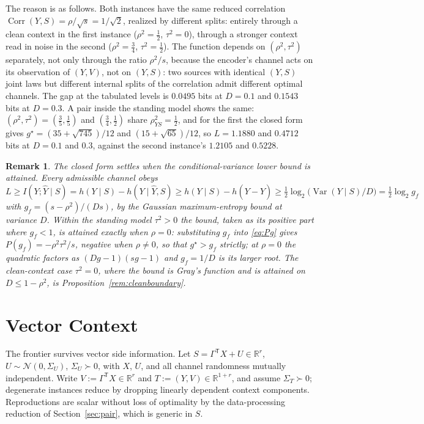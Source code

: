 \documentclass[11pt,onecolumn]{IEEEtran}
\newtheorem{remark}[theorem]{Remark}
\newcommand{\R}{\mathbb{R}}
\newcommand{\hY}{\widehat{Y}}
\begin{document}
The reason is as follows. Both instances have the same
reduced correlation $\operatorname{Corr}(Y,S)=\rho/\sqrt{s}=1/\sqrt2$,
realized by different splits: entirely through a clean context in the
first instance ($\rho^2=\tfrac12$, $\tau^2=0$), through a stronger
context read in noise in the second ($\rho^2=\tfrac34$,
$\tau^2=\tfrac12$). The function depends on $(\rho^2,\tau^2)$
separately, not only through the ratio $\rho^2/s$, because the
encoder's channel acts on its observation of $(Y,V)$, not on $(Y,S)$:
two sources with identical $(Y,S)$ joint laws but different internal
splits of the correlation admit different optimal channels.
The gap at the tabulated levels is $0.0495$ bits at $D=0.1$ and
$0.1543$ bits at $D=0.3$. A pair inside the standing model shows the
same: $(\rho^2,\tau^2)=(\tfrac35,\tfrac15)$ and $(\tfrac34,\tfrac12)$
share $\rho_{YS}^2=\tfrac12$, and for the first the closed form gives
$g^\star=(35+\sqrt{745})/12$ and $(15+\sqrt{65})/12$, so $L=1.1880$ and
$0.4712$ bits at $D=0.1$ and $0.3$, against the second instance's
$1.2105$ and $0.5228$.

\begin{remark}\label{rem:floor}
The closed form settles when the conditional-variance lower bound is
attained. Every admissible channel obeys
$L\ge I(Y;\hY\mid S)=h(Y\mid S)-h(Y\mid\hY,S)\ge h(Y\mid S)-h(Y-\hY)
\ge\tfrac12\log_2\bigl(\operatorname{Var}(Y\mid S)/D\bigr)
=\tfrac12\log_2 g_f$ with $g_f=(s-\rho^2)/(Ds)$, by the Gaussian
maximum-entropy bound at variance $D$. Within the standing model
$\tau^2>0$ the bound, taken as its positive part where $g_f<1$, is
attained exactly when $\rho=0$: substituting $g_f$ into \eqref{eq:Pg}
gives $P(g_f)=-\rho^2\tau^2/s$, negative when $\rho\ne0$, so that
$g^\star>g_f$ strictly; at $\rho=0$ the quadratic factors as
$(Dg-1)(sg-1)$ and $g_f=1/D$ is its larger root. The clean-context
case $\tau^2=0$, where the bound is Gray's function and is attained on
$D\le1-\rho^2$, is Proposition~\ref{rem:cleanboundary}.
\end{remark}

\section{Vector Context}
\label{sec:vector}

The frontier survives vector side information. Let
$S=\Gamma^{\mathsf T}X+U\in\R^r$, $U\sim\mathcal N(0,\Sigma_U)$,
$\Sigma_U\succ0$, with $X$, $U$, and all channel randomness mutually
independent. Write $V:=\Gamma^{\mathsf T}X\in\R^r$ and
$T:=(Y,V)\in\R^{1+r}$, and assume $\Sigma_T\succ0$; degenerate
instances reduce by dropping linearly dependent context components.
Reproductions are scalar without loss of optimality by the
data-processing reduction of Section~\ref{sec:pair}, which is generic
in $S$.
\end{document}
